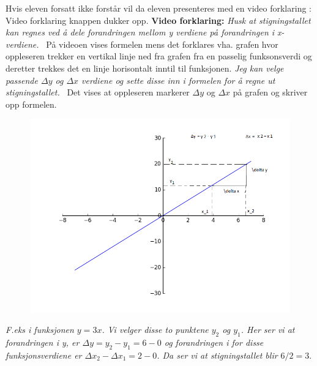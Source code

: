 \documentclass[12pt,twoside,onecolumn]{article}
\begin{document}
\begin{Exercise}
\begin{figure}[h!]
\begin{subfigure}{.5\textwidth}
    \end{subfigure}
\end{figure}
{\color{Maroon}Hvis eleven forsatt ikke forstår vil da eleven presenteres med en video forklaring :  Video forklaring knappen dukker opp.}
\newline
\newline
\textbf{Video forklaring:}
\newline\newline
{\emph{\color{gray}
Husk at stigningstallet kan regnes ved å dele forandringen mellom y verdiene på forandringen i x-verdiene.}} 
\newline
{\color{PineGreen} På videoen vises formelen mens det forklares vha. grafen hvor oppleseren trekker en vertikal linje ned fra grafen fra en passelig funksonsverdi og deretter trekkes det en linje horisontalt inntil til funksjonen.} \newline\newline
{\emph{\color{gray}
Jeg kan velge passende $\Delta y$ og $\Delta x$ verdiene og sette disse inn i formelen for å regne ut stigningstallet.}} \newline
{\color{PineGreen} Det vises at oppleseren markerer $\Delta y$ og $\Delta x$ på grafen og skriver opp formelen.} 
\begin{figure}[h!]
\centering
\includegraphics[scale = 0.4]{figures/stigningstallet.png}
\end{figure}
\newline\newline
{\emph{\color{gray}
F.eks i funksjonen $y = 3x$. Vi velger disse to punktene $y_2$ og $y_1$. Her ser vi at forandringen i y, er $\Delta y = y_2 - y_1 = 6- 0$ og forandringen i for disse funksjonsverdiene er $\Delta x_2 - \Delta x_1 = 2 - 0$. Da ser vi at stigningstallet blir $6/2 = 3.$}} \newline

\end{Exercise}
\end{document}
